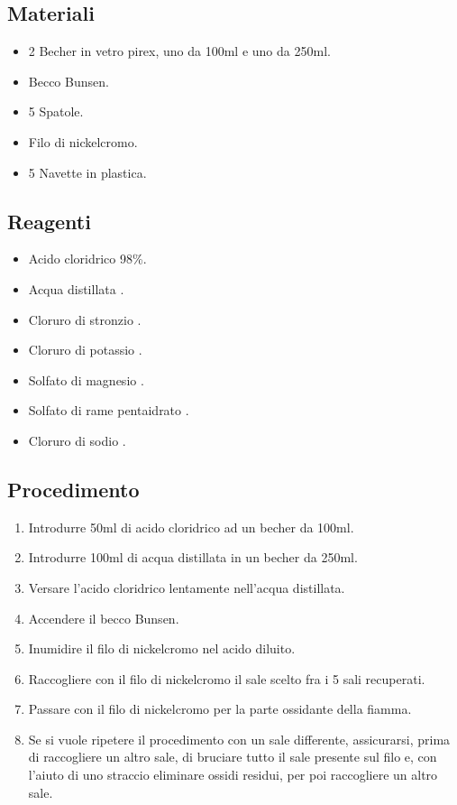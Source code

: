 \documentclass[a4paper,10pt]{article}
\begin{document}
	\subsection{Materiali}
	\begin{itemize}
		\item 2 Becher in vetro pirex, uno da 100ml e uno da 250ml.
		\item Becco Bunsen.
		\item 5 Spatole.
		\item Filo di nickelcromo.
		\item 5 Navette in plastica.
	\end{itemize}
	\subsection{Reagenti}
	\begin{itemize}
		\item Acido cloridrico  98\%.
		\item Acqua distillata .
		\item Cloruro di stronzio .
		\item Cloruro di potassio .
		\item Solfato di magnesio .
		\item Solfato di rame pentaidrato .
		\item Cloruro di sodio .
	\end{itemize}
	\subsection{Procedimento}
	\begin{enumerate}
		\item Introdurre 50ml di acido cloridrico ad un becher da 100ml.
		\item Introdurre 100ml di acqua distillata in un becher da 250ml.
		\item Versare l'acido cloridrico lentamente nell'acqua distillata.
		\item Accendere il becco Bunsen.
		\item Inumidire il filo di nickelcromo nel acido diluito.
		\item Raccogliere con il filo di nickelcromo il sale scelto fra i 5 sali recuperati.
		\item Passare con il filo di nickelcromo per la parte ossidante della fiamma.
		\item Se si vuole ripetere il procedimento con un sale differente, assicurarsi, prima di raccogliere un altro sale, di bruciare tutto il sale presente sul filo e, con l'aiuto di uno straccio eliminare ossidi residui, per poi raccogliere un altro sale.
	\end{enumerate}
	\break
\end{document}
